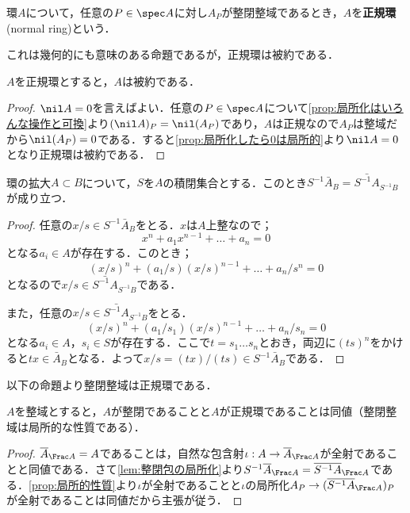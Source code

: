 \begin{defi}[正規環]
	環$A$について，任意の$P\in\spec A$に対し$A_P$が整閉整域であるとき，$A$を\textbf{正規環}(normal ring)という．
\end{defi}

これは幾何的にも意味のある命題であるが，正規環は被約である．

\begin{prop}
	$A$を正規環とすると，$A$は被約である．
\end{prop}

\begin{proof}
	$\nil A=0$を言えばよい．任意の$P\in\spec A$について\ref{prop:局所化はいろんな操作と可換}より$(\nil A)_P=\nil(A_P)$であり，$A$は正規なので$A_P$は整域だから$\nil (A_P)=0$である．すると\ref{prop:局所化したら0は局所的}より$\nil A=0$となり正規環は被約である．
\end{proof}

\begin{lem}\label{lem:整閉包の局所化}
	環の拡大$A\subset B$について，$S$を$A$の積閉集合とする．このとき$S^{-1}\bar{A}_B=\bar{S^{-1}A}_{S^{-1}B}$が成り立つ．
\end{lem}

\begin{proof}
	任意の$x/s\in S^{-1}\bar{A}_B$をとる．$x$は$A$上整なので；
	\[x^n+a_1x^{n-1}+\dots+a_n=0\]
	となる$a_i\in A$が存在する．このとき；
	\[(x/s)^n+(a_1/s)(x/s)^{n-1}+\dots+a_n/s^n=0\]
	となるので$x/s\in\bar{S^{-1}A}_{S^{-1}B}$である．
	
	また，任意の$x/s\in\bar{S^{-1}A}_{S^{-1}B}$をとる．
	\[(x/s)^n+(a_1/s_1)(x/s)^{n-1}+\dots+a_n/s_n=0\]
	となる$a_i\in A，s_i\in S$が存在する．ここで$t=s_1\dots s_n$とおき，両辺に$(ts)^n$をかけると$tx\in\bar{A}_B$となる．よって$x/s=(tx)/(ts)\in S^{-1}\bar{A}_B$である．
\end{proof}

以下の命題より整閉整域は正規環である．
\begin{prop}\label{prop:整域の整閉性はlocal}
	$A$を整域とすると，$A$が整閉であることと$A$が正規環であることは同値（整閉整域は局所的な性質である）．
\end{prop}

\begin{proof}
	$\bar{A}_{\Frac A}=A$であることは，自然な包含射$\iota:A\to \bar{A}_{\Frac A}$が全射であることと同値である．さて\ref{lem:整閉包の局所化}より$S^{-1}\bar{A}_{\Frac A}=\bar{S^{-1}A}_{\Frac A}$である．\ref{prop:局所的性質}より$\iota$が全射であることと$\iota$の局所化$A_P\to (\bar{S^{-1}A}_{\Frac A})_P$が全射であることは同値だから主張が従う．
\end{proof}


